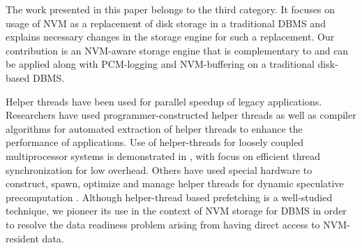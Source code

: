 The work presented in this paper belongs to the third category. It focuses on usage of NVM as a replacement of disk storage in a traditional DBMS and explains necessary changes in the storage engine for such a replacement. Our contribution is an NVM-aware storage engine that is complementary to and can be applied along with PCM-logging \cite{gao2011pcmlogging} and NVM-buffering \cite{son2017log} on a traditional disk-based DBMS.





Helper threads have been used for parallel speedup of legacy applications.  Researchers have used programmer-constructed helper threads \cite{kamruzzaman2011inter} as well as compiler algorithms \cite{kim2002design} for automated extraction of helper threads to enhance the performance of applications. Use of helper-threads for loosely coupled multiprocessor systems is demonstrated in \cite{jung2006helper}, with focus on efficient thread synchronization for low overhead. Others have used special hardware to construct, spawn, optimize and manage helper threads for dynamic speculative precomputation \cite{collins2001dynamic}. Although helper-thread based prefetching is a well-studied technique, we pioneer its use in the context of NVM storage for DBMS in order to resolve the data readiness problem arising from having direct access to NVM-resident data.
